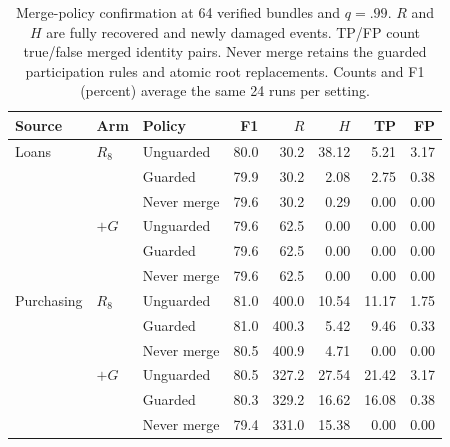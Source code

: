\begin{table}[t]
\centering\small
\setlength{\tabcolsep}{4pt}
\caption{Merge-policy confirmation at 64 verified bundles and $q=.99$. $R$ and $H$ are fully recovered and newly damaged events. TP/FP count true/false merged identity pairs. Never merge retains the guarded participation rules and atomic root replacements. Counts and F1 (percent) average the same 24 runs per setting.}
\label{tab:fresh-safety}
\begin{tabular}{lll rrrrr}
\toprule
Source & Arm & Policy & F1 & $R$ & $H$ & TP & FP \\ \midrule
Loans & $R_8$ & Unguarded & 80.0 & 30.2 & 38.12 & 5.21 & 3.17 \\
 &  & Guarded & 79.9 & 30.2 & 2.08 & 2.75 & 0.38 \\
 &  & Never merge & 79.6 & 30.2 & 0.29 & 0.00 & 0.00 \\
 & $+G$ & Unguarded & 79.6 & 62.5 & 0.00 & 0.00 & 0.00 \\
 &  & Guarded & 79.6 & 62.5 & 0.00 & 0.00 & 0.00 \\
 &  & Never merge & 79.6 & 62.5 & 0.00 & 0.00 & 0.00 \\
\midrule
Purchasing & $R_8$ & Unguarded & 81.0 & 400.0 & 10.54 & 11.17 & 1.75 \\
 &  & Guarded & 81.0 & 400.3 & 5.42 & 9.46 & 0.33 \\
 &  & Never merge & 80.5 & 400.9 & 4.71 & 0.00 & 0.00 \\
 & $+G$ & Unguarded & 80.5 & 327.2 & 27.54 & 21.42 & 3.17 \\
 &  & Guarded & 80.3 & 329.2 & 16.62 & 16.08 & 0.38 \\
 &  & Never merge & 79.4 & 331.0 & 15.38 & 0.00 & 0.00 \\
\bottomrule
\end{tabular}
\end{table}
